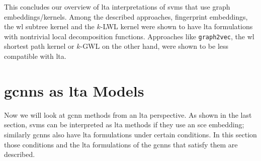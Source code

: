 This concludes our overview of \ac{lta} interpretations of \acp{svm} that use graph embeddings/kernels.
Among the described approaches, fingerprint embeddings, the \ac{wl} subtree kernel and the $k$-LWL kernel were shown to have \ac{lta} formulations with nontrivial local decomposition functions.
Approaches like \texttt{graph2vec}, the \ac{wl} shortest path kernel or $k$-GWL on the other hand, were shown to be less compatible with \ac{lta}.

\section{\acsp*{gcnn} as \acs*{lta} Models}%
\label{sec:ltag:formulation:gcnn}

Now we will look at \ac{gcnn} methods from an \ac{lta} perspective.
As shown in the last section, \acp{svm} can be interpreted as \ac{lta} methods if they use an \ac{sce} embedding;
similarly \acp{gcnn} also have \ac{lta} formulations under certain conditions.
In this section those conditions and the \ac{lta} formulations of the \acp{gcnn} that satisfy them are described.

